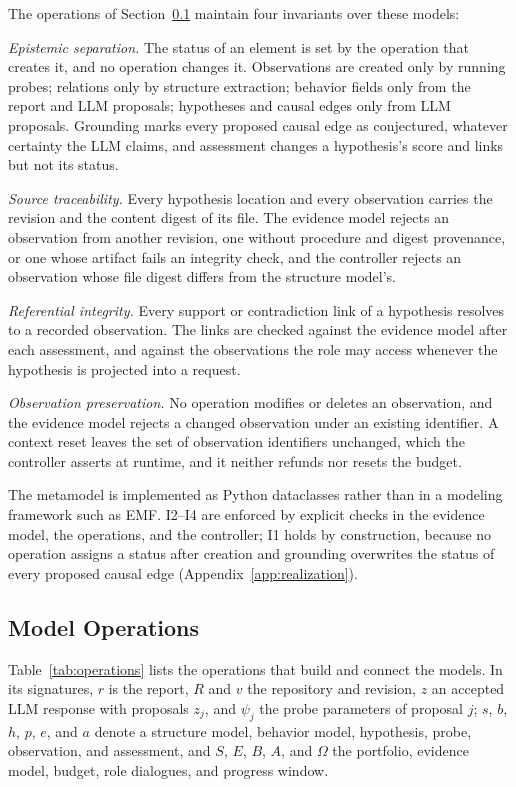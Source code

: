 \documentclass[letterpaper,journal]{IEEEtran}
\begin{document}
The operations of Section~\ref{sec:operations} maintain four invariants over these models:
\begin{IEEEdescription}[\IEEEsetlabelwidth{I4}]
\item[I1] \emph{Epistemic separation.} The status of an element is set by the operation that creates it, and no operation changes it. Observations are created only by running probes; relations only by structure extraction; behavior fields only from the report and LLM proposals; hypotheses and causal edges only from LLM proposals. Grounding marks every proposed causal edge as conjectured, whatever certainty the LLM claims, and assessment changes a hypothesis's score and links but not its status.
\item[I2] \emph{Source traceability.} Every hypothesis location and every observation carries the revision and the content digest of its file. The evidence model rejects an observation from another revision, one without procedure and digest provenance, or one whose artifact fails an integrity check, and the controller rejects an observation whose file digest differs from the structure model's.
\item[I3] \emph{Referential integrity.} Every support or contradiction link of a hypothesis resolves to a recorded observation. The links are checked against the evidence model after each assessment, and against the observations the role may access whenever the hypothesis is projected into a request.
\item[I4] \emph{Observation preservation.} No operation modifies or deletes an observation, and the evidence model rejects a changed observation under an existing identifier. A context reset leaves the set of observation identifiers unchanged, which the controller asserts at runtime, and it neither refunds nor resets the budget.
\end{IEEEdescription}
The metamodel is implemented as Python dataclasses rather than in a modeling framework such as EMF. I2--I4 are enforced by explicit checks in the evidence model, the operations, and the controller; I1 holds by construction, because no operation assigns a status after creation and grounding overwrites the status of every proposed causal edge (Appendix~\ref{app:realization}).

\subsection{Model Operations}\label{sec:operations}
Table~\ref{tab:operations} lists the operations that build and connect the models. In its signatures, $r$ is the report, $R$ and $v$ the repository and revision, $z$ an accepted LLM response with proposals $z_j$, and $\psi_j$ the probe parameters of proposal $j$; $s$, $b$, $h$, $p$, $e$, and $a$ denote a structure model, behavior model, hypothesis, probe, observation, and assessment, and $S$, $E$, $B$, $A$, and $\Omega$ the portfolio, evidence model, budget, role dialogues, and progress window.
\end{document}
